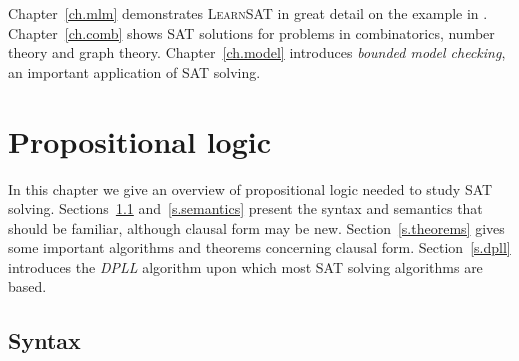 \documentclass[11pt]{report}
\newcommand*{\ls}{\textsc{LearnSAT}}
\begin{document}
Chapter~\ref{ch.mlm} demonstrates \ls{} in great detail on the example in \cite{mlm}. Chapter~\ref{ch.comb} shows SAT solutions for problems in combinatorics, number theory and graph theory. Chapter~\ref{ch.model} introduces \emph{bounded model checking}, an important application of SAT solving.



\chapter{Propositional logic}\label{ch.intro}

In this chapter we give an overview of propositional logic needed to study SAT solving. Sections~\ref{s.syntax} and~\ref{s.semantics} present the syntax and semantics that should be familiar, although clausal form may be new. Section~\ref{s.theorems} gives some important algorithms and theorems concerning clausal form. Section~\ref{s.dpll} introduces the \emph{DPLL} algorithm upon which most SAT solving algorithms are based.


\section{Syntax}\label{s.syntax}
\end{document}
